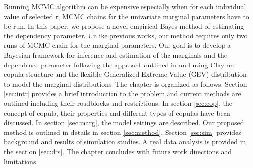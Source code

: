 \documentclass[11pt]{article}
\theoremstyle{remboldstyle}
\begin{document}
Running MCMC algorithm can be expensive especially when for each individual value of selected $\tau$, MCMC chains for the univariate marginal parameters have to be run. In this paper, we propose a novel empirical Bayes method of estimating the dependency parameter. Unlike previous works, our method requires only two runs of MCMC chain for the marginal parameters. Our goal is to develop a Bayesian framework for inference and estimation of the marginals and the dependence parameter following the approach outlined in \cite{doss:2010} and \cite{roy:2014} using Clayton copula structure and the flexible Generalized Extreme Value (GEV) distribution to model the marginal distributions. The chapter is organized as follows: Section \ref{sec:intr} provides a brief introduction to the problem and current methods are outlined including their roadblocks and restrictions. In section \ref{sec:cop}, the concept of copula, their properties and different types of copulas have been discussed. In section \ref{sec:marg}, the model settings are described. Our proposed method is outlined in details in section \ref{sec:method}. Section \ref{sec:sim} provides background and results of simulation studies. A real data analysis is provided in the section \ref{sec:drs}. The chapter concludes with future work directions and limitations.
\end{document}
